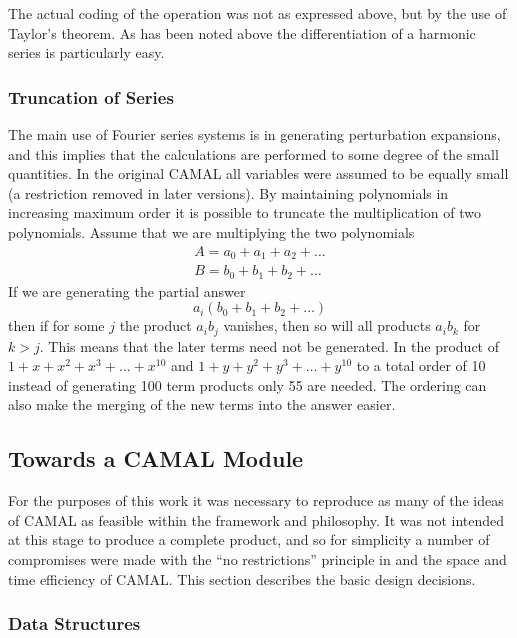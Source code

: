 The actual coding of the operation was not as expressed above, but by
the use of Taylor's theorem.  As has been noted above the
differentiation of a harmonic series is particularly easy.

\subsubsection{Truncation of Series}

The main use of Fourier series systems is in generating perturbation
expansions, and this implies that the calculations are performed to
some degree of the small quantities.  In the original CAMAL all
variables were assumed to be equally small (a restriction removed in
later versions).  By maintaining polynomials in increasing maximum
order it is possible to truncate the multiplication of two
polynomials.  Assume that we are multiplying the two polynomials
\begin{eqnarray*}
        A = a_0 + a_1 + a_2 + \ldots \\
        B = b_0 + b_1 + b_2 + \ldots
\end{eqnarray*}
If we are generating the partial answer
\[
        a_i (b_0 + b_1 + b_2 + \ldots)
\]
then if for some $j$ the product $a_i b_j$ vanishes, then so will all
products $a_i b_k$ for $k>j$.  This means that the later terms need
not be generated.  In the product of $1+x+x^2+x^3+\ldots+x^{10}$ and
$1+y+y^2+y^3+\ldots+y^{10}$ to a total order of 10 instead of generating
100 term products only 55 are needed.  The ordering can also make the
merging of the new terms into the answer easier.

\subsection{Towards a CAMAL Module}

For the purposes of this work it was necessary to reproduce as many of
the ideas of CAMAL as feasible within the \REDUCE framework and
philosophy.  It was not intended at this stage to produce a complete
product, and so for simplicity a number of compromises were made with
the ``no restrictions'' principle in \REDUCE and the space and time
efficiency of CAMAL.  This section describes the basic design
decisions.

\subsubsection{Data Structures}

